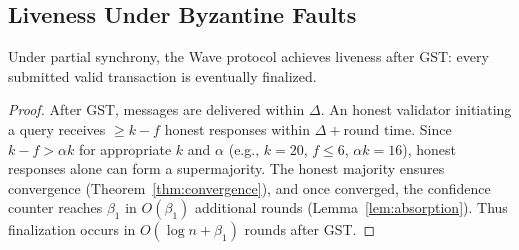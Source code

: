 \subsection{Liveness Under Byzantine Faults}

\begin{lemma}
\label{lem:liveness}
Under partial synchrony, the Wave protocol achieves liveness after GST: every submitted
valid transaction is eventually finalized.
\end{lemma}

\begin{proof}
After GST, messages are delivered within $\Delta$. An honest validator initiating a query
receives $\geq k - f$ honest responses within $\Delta + \text{round time}$. Since
$k - f > \alpha k$ for appropriate $k$ and $\alpha$ (e.g., $k = 20$, $f \leq 6$, $\alpha k = 16$),
honest responses alone can form a supermajority. The honest majority ensures convergence
(Theorem~\ref{thm:convergence}), and once converged, the confidence counter reaches $\beta_1$
in $O(\beta_1)$ additional rounds (Lemma~\ref{lem:absorption}). Thus finalization occurs
in $O(\log n + \beta_1)$ rounds after GST.
\end{proof}

